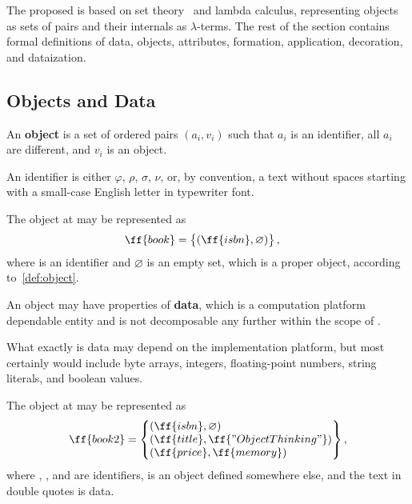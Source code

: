The proposed \phic{} is based on set theory~\citep{jech2013set} and lambda calculus,
representing objects as sets of pairs and their internals as \(\lambda\)-terms.
The rest of the section contains formal definitions of
data, objects, attributes, formation, application, decoration, and dataization.

\subsection{Objects and Data}

\begin{definition}\label{def:object}
An \textbf{object} is a set of ordered pairs \((a_i, v_i)\) such that
\(a_i\) is an identifier, all \(a_i\) are different, and \(v_i\) is an object.
\end{definition}

An identifier is either \(\varphi\), \(\rho\), \(\sigma\), \(\nu\), or, by convention, a text without
spaces starting with a small-case English letter in typewriter font.

The object at  may be represented as
\begin{equation}\label{eq:book}
\begin{split}
\ff{book} & = \left\{\begin{matrix*}[l]
  (\ff{isbn}, \varnothing) \\
\end{matrix*}\right\},
\end{split}
\end{equation}
where  is an identifier and \(\varnothing\) is an empty
set, which is a proper object, according to~\cref{def:object}.

\begin{definition}\label{def:data}
An object may have properties of \textbf{data},
which is a computation platform dependable entity and is not
decomposable any further within the scope of \phic{}.
\end{definition}

What exactly is data may depend on the
implementation platform, but most certainly would include
byte arrays, integers, floating-point numbers,
string literals, and boolean values.

The object at  may be represented as
\begin{equation}\label{eq:book2}
\begin{split}
\ff{book2} & = \left\{\begin{matrix*}[l]
  (\ff{isbn}, \varnothing) \\
  (\ff{title}, \ff{"Object Thinking"}) \\
  (\ff{price}, \ff{memory}) \\
\end{matrix*}\right\}, \\
\end{split}
\end{equation}
where , , and  are identifiers,
 is an object defined somewhere else,
and the text in double quotes is data.

